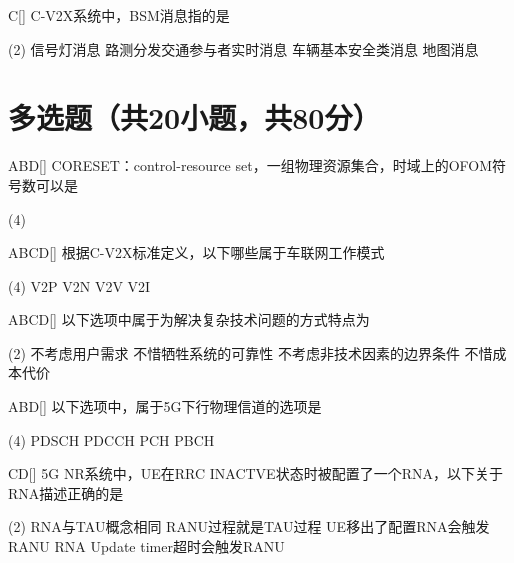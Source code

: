 \begin{choice}{C}[]
    C-V2X系统中，BSM消息指的是
    \begin{tasks}(2)
        \task 信号灯消息
        \task 路测分发交通参与者实时消息
        \task 车辆基本安全类消息
        \task 地图消息
    \end{tasks}
\end{choice}

\section{多选题（共20小题，共80分）}

\begin{choice}{\;ABD\;}[]
    CORESET：control-resource set，一组物理资源集合，时域上的OFOM符号数可以是
    \begin{tasks}(4)
    \end{tasks}
\end{choice}

\begin{choice}{\;ABCD\;}[]
    根据C-V2X标准定义，以下哪些属于车联网工作模式
    \begin{tasks}(4)
        \task V2P
        \task V2N
        \task V2V
        \task V2I
    \end{tasks}
\end{choice}

\begin{choice}{\;ABCD\;}[]
    以下选项中属于为解决复杂技术问题的方式特点为
    \begin{tasks}(2)
        \task 不考虑用户需求
        \task 不惜牺牲系统的可靠性
        \task 不考虑非技术因素的边界条件
        \task 不惜成本代价
    \end{tasks}
\end{choice}

\begin{choice}{\;ABD\;}[]
    以下选项中，属于5G下行物理信道的选项是
    \begin{tasks}(4)
        \task PDSCH
        \task PDCCH
        \task PCH
        \task PBCH
    \end{tasks}
\end{choice}


\begin{choice}{\;CD\;}[]
    5G NR系统中，UE在RRC INACTVE状态时被配置了一个RNA，以下关于RNA描述正确的是
    \begin{tasks}(2)
        \task RNA与TAU概念相同
        \task RANU过程就是TAU过程
        \task UE移出了配置RNA会触发RANU
        \task RNA Update timer超时会触发RANU
    \end{tasks}
\end{choice}

